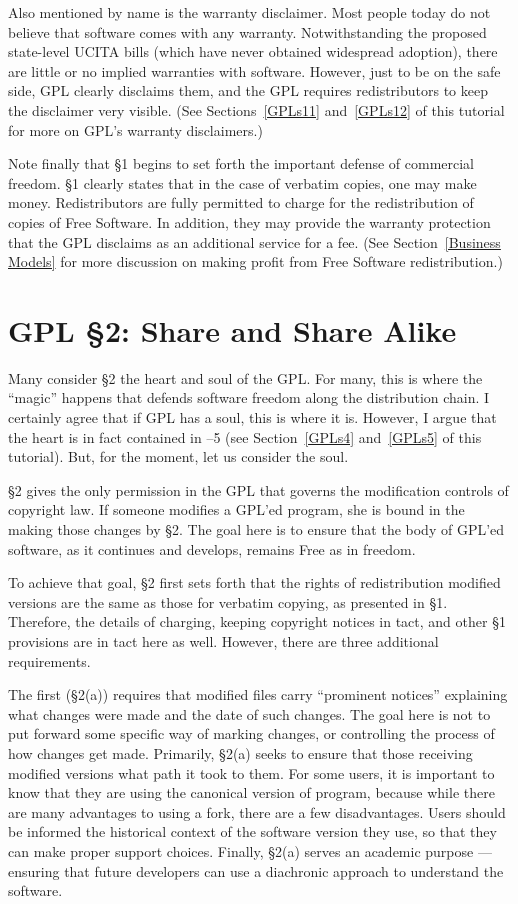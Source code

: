 \documentclass[12pt]{report}
\begin{document}
Also mentioned by name is the warranty disclaimer.  Most people today do
not believe that software comes with any warranty.  Notwithstanding the
proposed state-level UCITA bills (which have never obtained widespread
adoption), there are little or no implied warranties with software.
However, just to be on the safe side, GPL clearly disclaims them, and the
GPL requires redistributors to keep the disclaimer very visible.  (See
Sections~\ref{GPLs11} and~\ref{GPLs12} of this tutorial for more on GPL's
warranty disclaimers.)

Note finally that \S 1 begins to set forth the important defense of
commercial freedom.  \S 1 clearly states that in the case of verbatim
copies, one may make money.  Redistributors are fully permitted to charge
for the redistribution of copies of Free Software.  In addition, they may
provide the warranty protection that the GPL disclaims as an additional
service for a fee.  (See Section~\ref{Business Models} for more discussion
on making profit from Free Software redistribution.)

\section{GPL \S 2: Share and Share Alike}

Many consider \S 2 the heart and soul of the GPL\@.  For many, this is
where the ``magic'' happens that defends software freedom along the
distribution chain.  I certainly agree that if GPL has a soul, this is
where it is.  However, I argue that the heart is in fact contained in --5 (see Section~\ref{GPLs4} and~\ref{GPLs5} of this tutorial).  But, for
the moment, let us consider the soul.

\S 2 gives the only permission in the GPL that governs the modification
controls of copyright law.  If someone modifies a GPL'ed program, she is
bound in the making those changes by \S 2.  The goal here is to ensure
that the body of GPL'ed software, as it continues and develops, remains
Free as in freedom.

To achieve that goal, \S 2 first sets forth that the rights of
redistribution modified versions are the same as those for verbatim
copying, as presented in \S 1.  Therefore, the details of charging,
keeping copyright notices in tact, and other \S 1 provisions are in tact
here as well.  However, there are three additional requirements.

The first (\S 2(a)) requires that modified files carry ``prominent
notices'' explaining what changes were made and the date of such changes.
The goal here is not to put forward some specific way of marking changes,
or controlling the process of how changes get made.  Primarily, \S 2(a)
seeks to ensure that those receiving modified versions what path it took
to them.  For some users, it is important to know that they are using the
canonical version of program, because while there are many advantages to
using a fork, there are a few disadvantages.  Users should be informed the
historical context of the software version they use, so that they can make
proper support choices.  Finally, \S 2(a) serves an academic purpose ---
ensuring that future developers can use a diachronic approach to
understand the software.
\end{document}
